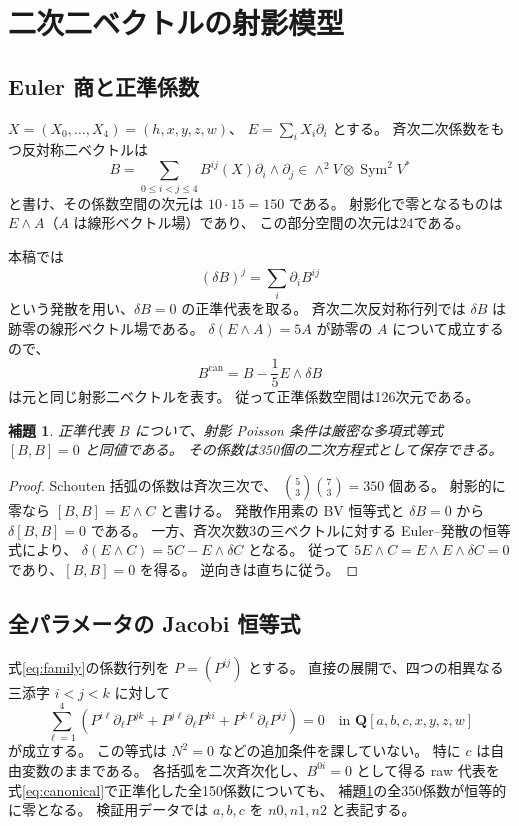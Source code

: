 \documentclass[11pt,a4paper]{ltjsarticle}
\newcommand{\QQ}{\mathbf Q}
\newcommand{\Sym}{\operatorname{Sym}}
\newtheorem{lemma}[theorem]{補題}
\theoremstyle{remark}
\begin{document}
\section{二次二ベクトルの射影模型}

\subsection{Euler 商と正準係数}

$X=(X_0,\ldots,X_4)=(h,x,y,z,w)$、
$E=\sum_iX_i\partial_i$ とする。
斉次二次係数をもつ反対称二ベクトルは
\[
 B=\sum_{0\le i<j\le4}B^{ij}(X)\partial_i\wedge\partial_j
 \in \wedge^2 V\otimes\Sym^2V^*
\]
と書け、その係数空間の次元は $10\cdot15=150$ である。
射影化で零となるものは $E\wedge A$（$A$ は線形ベクトル場）であり、
この部分空間の次元は24である。

本稿では
\[
 (\delta B)^j=\sum_i\partial_i B^{ij}
\]
という発散を用い、$\delta B=0$ の正準代表を取る。
斉次二次反対称行列では $\delta B$ は跡零の線形ベクトル場である。
$\delta(E\wedge A)=5A$ が跡零の $A$ について成立するので、
\begin{equation}\label{eq:canonical}
 B^{\mathrm{can}}=B-\frac15E\wedge\delta B
\end{equation}
は元と同じ射影二ベクトルを表す。
従って正準係数空間は126次元である。

\begin{lemma}\label{lem:strict}
正準代表 $B$ について、射影 Poisson 条件は厳密な多項式等式
$[B,B]=0$ と同値である。
その係数は350個の二次方程式として保存できる。
\end{lemma}
\begin{proof}
Schouten 括弧の係数は斉次三次で、
$\binom53\binom73=350$ 個ある。
射影的に零なら $[B,B]=E\wedge C$ と書ける。
発散作用素の BV 恒等式と $\delta B=0$ から $\delta[B,B]=0$ である。
一方、斉次次数3の三ベクトルに対する Euler--発散の恒等式により、
$\delta(E\wedge C)=5C-E\wedge\delta C$ となる。
従って $5E\wedge C=E\wedge E\wedge\delta C=0$ であり、$[B,B]=0$ を得る。
逆向きは直ちに従う。
\end{proof}

\subsection{全パラメータの Jacobi 恒等式}

式\eqref{eq:family}の係数行列を $P=(P^{ij})$ とする。
直接の展開で、四つの相異なる三添字 $i<j<k$ に対して
\begin{equation}\label{eq:affine-jacobi}
 \sum_{\ell=1}^4
 \left(P^{i\ell}\partial_\ell P^{jk}
      +P^{j\ell}\partial_\ell P^{ki}
      +P^{k\ell}\partial_\ell P^{ij}\right)=0
 \quad\text{in }\QQ[a,b,c,x,y,z,w]
\end{equation}
が成立する。
この等式は $N^2=0$ などの追加条件を課していない。
特に $c$ は自由変数のままである。
各括弧を二次斉次化し、$B^{0i}=0$ として得る raw 代表を
式\eqref{eq:canonical}で正準化した全150係数についても、
補題\ref{lem:strict}の全350係数が恒等的に零となる。
検証用データでは $a,b,c$ を $n0,n1,n2$ と表記する。
\end{document}

